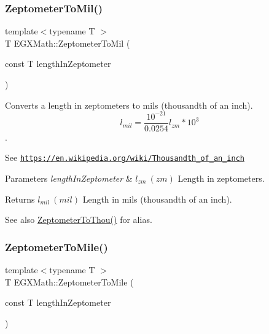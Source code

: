 \subsubsection{\texorpdfstring{Zeptometer\+To\+Mil()}{ZeptometerToMil()}}
{\footnotesize\ttfamily template$<$typename T $>$ \\
T E\+G\+X\+Math\+::\+Zeptometer\+To\+Mil (\begin{DoxyParamCaption}\item[{const T}]{length\+In\+Zeptometer }\end{DoxyParamCaption})}



Converts a length in zeptometers to mils (thousandth of an inch). \[ l_{mil}= \frac{10^{-21}}{0.0254} l_{zm} * 10^{3} \]. 

See \href{https://en.wikipedia.org/wiki/Thousandth_of_an_inch}{\tt https\+://en.\+wikipedia.\+org/wiki/\+Thousandth\+\_\+of\+\_\+an\+\_\+inch} 
\begin{DoxyParams}{Parameters}
{\em length\+In\+Zeptometer} & $ l_{zm}\ (zm)$ Length in zeptometers. \\
\hline
\end{DoxyParams}
\begin{DoxyReturn}{Returns}
$ l_{mil}\ (mil)$ Length in mils (thousandth of an inch). 
\end{DoxyReturn}
\begin{DoxySeeAlso}{See also}
\mbox{\hyperlink{group___e_g_x_math-_conversions-_length_conversions-_s_i-_zeptometer-_imperial_ga14432ed712e073dcae040496f83464b6}{Zeptometer\+To\+Thou()}} for alias. 
\end{DoxySeeAlso}
\mbox{\label{group___e_g_x_math-_conversions-_length_conversions-_s_i-_zeptometer-_imperial_ga2cd73cc7564758f2bf88f1a6e9269aff}} 
\subsubsection{\texorpdfstring{Zeptometer\+To\+Mile()}{ZeptometerToMile()}}
{\footnotesize\ttfamily template$<$typename T $>$ \\
T E\+G\+X\+Math\+::\+Zeptometer\+To\+Mile (\begin{DoxyParamCaption}\item[{const T}]{length\+In\+Zeptometer }\end{DoxyParamCaption})}



